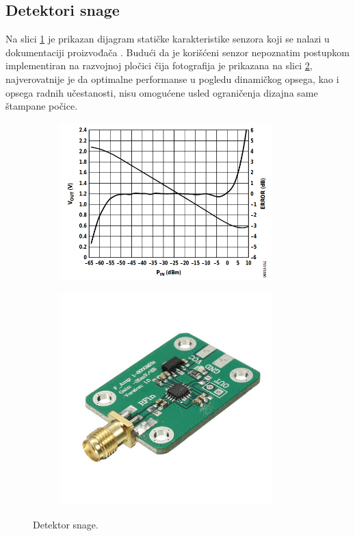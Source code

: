 \documentclass[a4paper, 12pt, diplomski]{etf}
\begin{document}
\subsection{Detektori snage}
Na slici \ref{fig:man_doc} je prikazan dijagram statičke karakteristike 
senzora koji se nalazi u dokumentaciji proizvođača
\cite{ad8318}. Budući da je korišćeni senzor nepoznatim postupkom  
implementiran na razvojnoj pločici čija fotografija je prikazana na 
slici \ref{fig:plocica}, najverovatnije je da optimalne performanse u pogledu
dinamičkog opsega, kao i opsega radnih učestanosti, nisu omogućene usled ograničenja dizajna same štampane počice.
%
\begin{figure}[b!]
    \begin{subfigure}[b]{0.49\textwidth}
        \includegraphics[width = 0.9\textwidth]{fig/documentation_V_vs_P.png}
        \label{fig:man_doc}
    \end{subfigure}
    \begin{subfigure}[b]{0.49\textwidth}
    \includegraphics[width = 0.9\textwidth]{fig/ad8318.JPG}
    \label{fig:plocica}
    \end{subfigure}
    \caption{Detektor snage.}
    \label{fig:rf_detect}
\end{figure}
\end{document}
